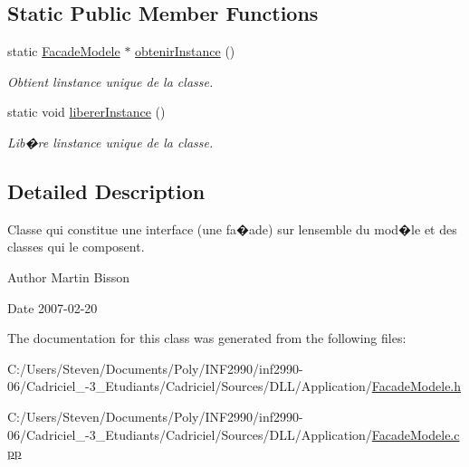 \subsection*{Static Public Member Functions}
\begin{DoxyCompactItemize}
\item 
static \hyperlink{class_facade_modele}{Facade\+Modele} $\ast$ \hyperlink{group__inf2990_gaf52e6d65d1a911d3e1699fc30af97d38}{obtenir\+Instance} ()
\begin{DoxyCompactList}\small\item\em Obtient l\textquotesingle{}instance unique de la classe. \end{DoxyCompactList}\item 
static void \hyperlink{group__inf2990_gacbf0495fda26f5be37089470dc5f4372}{liberer\+Instance} ()
\begin{DoxyCompactList}\small\item\em Lib�re l\textquotesingle{}instance unique de la classe. \end{DoxyCompactList}\end{DoxyCompactItemize}


\subsection{Detailed Description}
Classe qui constitue une interface (une fa�ade) sur l\textquotesingle{}ensemble du mod�le et des classes qui le composent. 

\begin{DoxyAuthor}{Author}
Martin Bisson 
\end{DoxyAuthor}
\begin{DoxyDate}{Date}
2007-\/02-\/20 
\end{DoxyDate}


The documentation for this class was generated from the following files\+:\begin{DoxyCompactItemize}
\item 
C\+:/\+Users/\+Steven/\+Documents/\+Poly/\+I\+N\+F2990/inf2990-\/06/\+Cadriciel\+\_-\/3\+\_\+\+Etudiants/\+Cadriciel/\+Sources/\+D\+L\+L/\+Application/\hyperlink{_facade_modele_8h}{Facade\+Modele.\+h}\item 
C\+:/\+Users/\+Steven/\+Documents/\+Poly/\+I\+N\+F2990/inf2990-\/06/\+Cadriciel\+\_-\/3\+\_\+\+Etudiants/\+Cadriciel/\+Sources/\+D\+L\+L/\+Application/\hyperlink{_facade_modele_8cpp}{Facade\+Modele.\+cpp}\end{DoxyCompactItemize}
